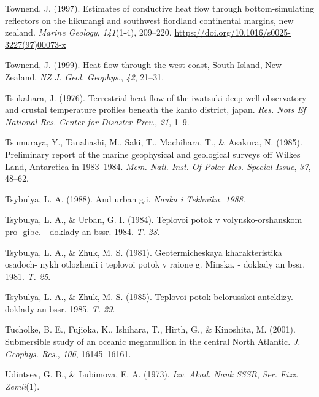 \begin{CSLReferences}{1}{1}
\leavevmode{}%
Townend, J. (1997). Estimates of conductive heat flow through bottom-simulating reflectors on the hikurangi and southwest fiordland continental margins, new zealand. \emph{Marine Geology}, \emph{141}(1-4), 209--220. \url{https://doi.org/10.1016/s0025-3227(97)00073-x}

\leavevmode{}%
Townend, J. (1999). Heat flow through the west coast, {South Island, New Zealand}. \emph{NZ J. Geol. Geophys.}, \emph{42}, 21--31.

\leavevmode{}%
Tsukahara, J. (1976). Terrestrial heat flow of the iwatsuki deep well observatory and crustal temperature profiles beneath the kanto district, japan. \emph{Res. Nots Ef National Res. Center for Disaster Prev.}, \emph{21}, 1--9.

\leavevmode{}%
Tsumuraya, Y., Tanahashi, M., Saki, T., Machihara, T., \& Asakura, N. (1985). Preliminary report of the marine geophysical and geological surveys off {Wilkes Land, Antarctica} in 1983--1984. \emph{Mem. Natl. Inst. Of Polar Res. Special Issue}, \emph{37}, 48--62.

\leavevmode{}%
Tsybulya, L. A. (1988). And urban g.i. \emph{Nauka i Tekhnika. 1988}.

\leavevmode{}%
Tsybulya, L. A., \& Urban, G. I. (1984). Teplovoi potok v volynsko-orshanskom pro- gibe. - doklady an bssr. 1984. \emph{T. 28}.

\leavevmode{}%
Tsybulya, L. A., \& Zhuk, M. S. (1981). Geotermicheskaya kharakteristika osadoch- nykh otlozhenii i teplovoi potok v raione g. Minska. - doklady an bssr. 1981. \emph{T. 25}.

\leavevmode{}%
Tsybulya, L. A., \& Zhuk, M. S. (1985). Teplovoi potok belorusskoi anteklizy. - doklady an bssr. 1985. \emph{T. 29}.

\leavevmode{}%
Tucholke, B. E., Fujioka, K., Ishihara, T., Hirth, G., \& Kinoshita, M. (2001). Submersible study of an oceanic megamullion in the central {North Atlantic}. \emph{J. Geophys. Res.}, \emph{106}, 16145--16161.

\leavevmode{}%
Udintsev, G. B., \& Lubimova, E. A. (1973). \emph{Izv. Akad. Nauk SSSR}, \emph{Ser. Fizz. Zemli}(1).


\end{CSLReferences}
